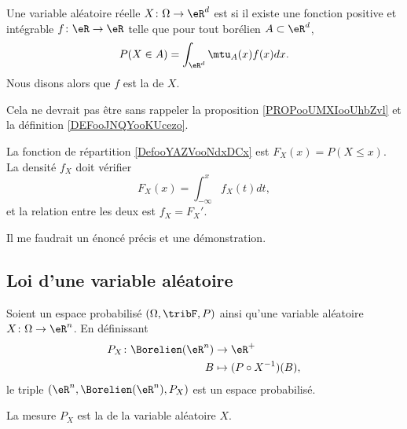 \begin{definition}      \label{DEFooRNKZooRczFwB}
	Une variable aléatoire réelle \( X\colon \Omega\to \eR^d\) est  si il existe une fonction positive et intégrable \( f\colon \eR\to \eR\) telle que pour tout borélien \( A\subset \eR^d\),
	\begin{equation}
		P(X\in A)=\int_{\eR^d}\mtu_A(x)f(x)dx.
	\end{equation}
	Nous disons alors que \( f\) est la  de \( X\).
\end{definition}
Cela ne devrait pas être sans rappeler la proposition \ref{PROPooUMXIooUhbZvl} et la définition \ref{DEFooJNQYooKUcezo}.


\begin{probleme}		\label{PROBooSWDQooHlSZPD}
	La fonction de répartition \ref{DefooYAZVooNdxDCx} est \( F_X(x)=P(X\leq x)\). La densité \( f_X\) doit vérifier
	\begin{equation}
		F_X(x)=\int_{-\infty}^xf_X(t)dt,
	\end{equation}
	et la relation entre les deux est \( f_X=F_X'\).

	Il me faudrait un énoncé précis et une démonstration.
\end{probleme}


\subsection{Loi d'une variable aléatoire}

\begin{propositionDef}        \label{DEFooBKJVooRJdMeA}
	Soient un espace probabilisé \( (\Omega,\tribF,P)\) ainsi qu'une variable aléatoire \( X\colon \Omega\to \eR^n\). En définissant
	\begin{equation}
		\begin{aligned}
			P_X\colon \Borelien(\eR^n) & \to \eR^+                   \\
			B                          & \mapsto (P\circ X^{-1})(B),
		\end{aligned}
	\end{equation}
	le triple \( (\eR^n,\Borelien(\eR^n),P_X)\) est un espace probabilisé.

	La mesure \( P_X\) est la  de la variable aléatoire \( X\).

\end{propositionDef}


